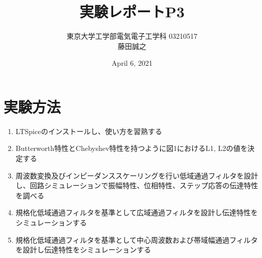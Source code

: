 \documentclass[a4j,dvipdfmx]{article}
\title{実験レポートP3}
\author{東京大学工学部電気電子工学科 03210517\\ 藤田誠之 }
\date{April 6, 2021}
\begin{document}
\maketitle
\section{実験方法}

\begin{enumerate}[label={(\arabic*)}]
\item LTSpiceのインストールし、使い方を習熟する
\item Butterworth特性とChebyshev特性を持つように図1におけるL1, L2の値を決定する
\item 周波数変換及びインピーダンススケーリングを行い低域通過フィルタを設計し、回路シミュレーションで振幅特性、位相特性、ステップ応答の伝達特性を調べる
\item 規格化低域通過フィルタを基準として広域通過フィルタを設計し伝達特性をシミュレーションする
\item 規格化低域通過フィルタを基準として中心周波数および帯域幅通過フィルタを設計し伝達特性をシミュレーションする
\end{enumerate}

\end{document}
